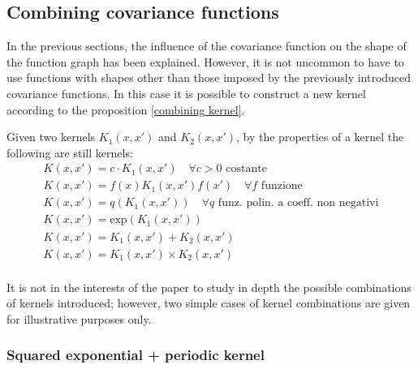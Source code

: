 \newpage

\subsection{Combining covariance functions}
In the previous sections, the influence of the covariance function on the shape of the function graph has been explained. However, it is not uncommon to have to use functions with shapes other than those imposed by the previously introduced covariance functions. In this case it is possible to construct a new kernel according to the proposition \ref{combining kernel}.


\begin{prop} \label{combining kernel}
  Given two kernels $K_1(x,x')$ and $K_2(x,x')$, by the properties of a kernel the following are still kernels:
\[
\begin{array}{l}
    K(x,x') = c\cdot K_1(x,x') \quad \forall c>0 \text{ costante}\\
    K(x,x') = f(x)K_1(x,x')f(x') \quad \forall f \text{ funzione}\\
    K(x,x') = q(K_1(x,x')) \quad \forall q \text{ funz. polin. a coeff. non negativi}\\
    K(x,x') = \text{exp}(K_1(x,x'))\\
    K(x,x') = K_1(x,x')+K_2(x,x')\\
    K(x,x') = K_1(x,x')\times K_2(x,x')\\
\end{array}
\]
\end{prop}
It is not in the interests of the paper to study in depth the possible combinations of kernels introduced; however, two simple cases of kernel combinations are given for illustrative purposes only.

\newpage




\subsubsection{Squared exponential + periodic kernel}


